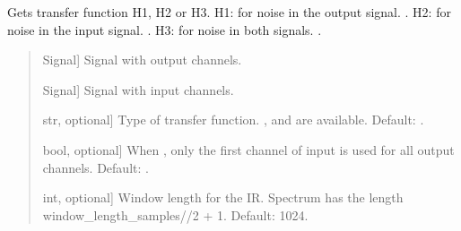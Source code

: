 \documentclass[letterpaper,10pt,english]{sphinxmanual}
\begin{document}
\begin{fulllineitems}
\label{\detokenize{modules/dsptools.transfer_functions:dsptools.transfer_functions.compute_transfer_function}}
\pysigstartsignatures
{}
\pysigstopsignatures
\sphinxAtStartPar
Gets transfer function H1, H2 or H3.
H1: for noise in the output signal. .
H2: for noise in the input signal. .
H3: for noise in both signals. .
\begin{quote}\begin{description}
\begin{description}
\sphinxlineitem{\sphinxstylestrong{output}}{[}Signal{]}
\sphinxAtStartPar
Signal with output channels.

\sphinxlineitem{\sphinxstylestrong{input}}{[}Signal{]}
\sphinxAtStartPar
Signal with input channels.

\sphinxlineitem{\sphinxstylestrong{mode}}{[}str, optional{]}
\sphinxAtStartPar
Type of transfer function. ,  and  are available.
Default: .

\sphinxlineitem{\sphinxstylestrong{multichannel}}{[}bool, optional{]}
\sphinxAtStartPar
When ,  only the first channel of input is used for all output
channels. Default: .

\sphinxlineitem{\sphinxstylestrong{window\_length\_samples}}{[}int, optional{]}
\sphinxAtStartPar
Window length for the IR. Spectrum has the length
window\_length\_samples//2 + 1. Default: 1024.


\end{description}
\end{description}
\end{quote}
\end{fulllineitems}
\end{document}
